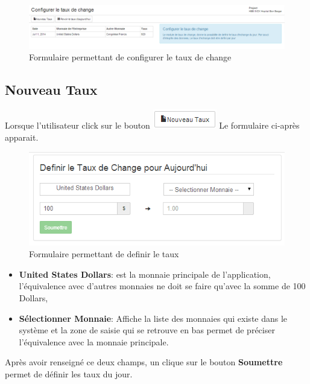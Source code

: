 \documentclass[12pt,a4paper]{report}
\begin{document}
\begin{figure}[h]
\begin{center}
\includegraphics[width=16cm]{pic/FormulaireConfigRate.png}
\end{center}
\caption{Formulaire permettant de configurer le taux de change}
\label{Formulaire permettant de configurer le taux de change}
\end{figure}

\subsection{Nouveau Taux}
Lorsque l'utilisateur click sur le bouton \includegraphics[scale=0.7]{pic/NouveauTaux.png}
 Le formulaire ci-après apparait.

\begin{figure}[h]
\begin{center}
\includegraphics[width=12cm]{pic/DefinirTaux.png}
\end{center}
\caption{Formulaire permettant de definir le taux}
\label{Formulaire permettant de definir le taux}
\end{figure}
\begin{itemize}
\item \textbf{United States Dollars}: est la monnaie principale de l'application, l'équivalence avec d'autres monnaies ne doit se faire qu'avec la somme de 100 Dollars,
\item \textbf{Sélectionner Monnaie}: Affiche la liste des monnaies qui existe dans le système et la zone de saisie qui se retrouve en bas permet de préciser l'équivalence avec la monnaie principale.
\end{itemize}
Après avoir renseigné ce deux champs, un clique sur le bouton \textbf{Soumettre} permet de définir les taux du jour.
\end{document}

